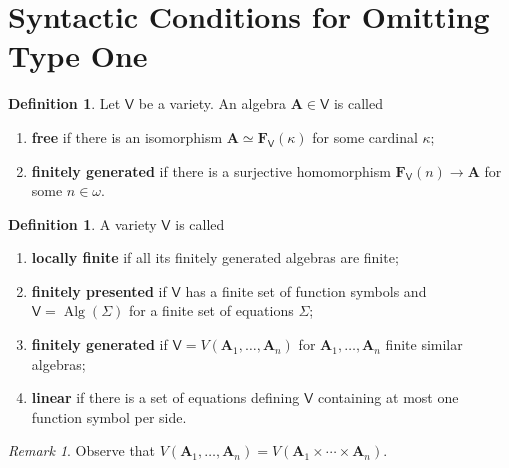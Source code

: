 \documentclass{amsart}
\theoremstyle{plain}
\theoremstyle{definition}
\newtheorem{definition}[theorem]{Definition}
\theoremstyle{remark}
\newtheorem{remark}[theorem]{Remark}
\DeclareMathOperator{\Alg}{Alg}
\begin{document}
\section{Syntactic Conditions for Omitting Type One}

\begin{definition}
    Let $\mathsf{V}$ be a variety. 
    An algebra $\mathbf{A} \in \mathsf{V}$ is called
    \begin{enumerate}
        \item \textbf{free} if there is an isomorphism $\mathbf{A} \simeq \mathbf{F}_{\mathsf{V}}(\kappa)$ for some cardinal $\kappa$; 
        \item \textbf{finitely generated} if there is a surjective homomorphism $\mathbf{F}_{\mathsf{V}}(n) \to \mathbf{A}$ for some $n \in \omega$. 
    \end{enumerate} 
\end{definition}

\begin{definition}
    A variety $\mathsf{V}$ is called 
    \begin{enumerate}
    \item \textbf{locally finite} if all its finitely generated algebras are finite; 
    \item \textbf{finitely presented} if $\mathsf{V}$ has a finite set of function symbols and $\mathsf{V}= \Alg(\Sigma)$ for a finite set of equations $\Sigma$; 
    \item \textbf{finitely generated} if $\mathsf{V}=V(\mathbf{A}_1, \ldots, \mathbf{A}_n)$ for $\mathbf{A}_1, \ldots, \mathbf{A}_n$ finite similar algebras; 
    \item \textbf{linear} if there is a set of equations defining $\mathsf{V}$ containing at most one function symbol per side. 
    \end{enumerate}
\end{definition}

\begin{remark}
    Observe that $V(\mathbf{A}_1, \ldots, \mathbf{A}_n)=V(\mathbf{A}_1 \times \cdots \times \mathbf{A}_n)$.  
\end{remark}
\end{document}
